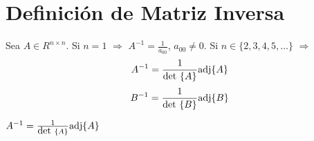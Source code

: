 \documentclass{article}
\def\InvDA{
$A^{-1}=\frac{1}{\mbox{\rm det\ }\{A\}}\mbox{\rm adj}\{A\}$
}
\def\InvD#1{
#1^{-1}=\frac{1}{\mbox{\rm det\ }\{#1\}}\mbox{\rm adj}\{#1\}
}
\begin{document}
\section{Def\/inici\'on de Matriz Inversa}
Sea $A\in R^{n\times n}$. Si $n=1$ $\Rightarrow$ 
$A^{-1}=\frac{1}{a_{00}}$, $a_{00}\neq 0$. Si $n\in\{2,3,4,5,\ldots\}$
$\Rightarrow$ 
\[
A^{-1}=\frac{1}
{\mbox{\rm det\ }\{A\}}\mbox{\rm adj}\{A\}
\]
\[
\InvD{B}
\]
\InvDA
\end{document}
